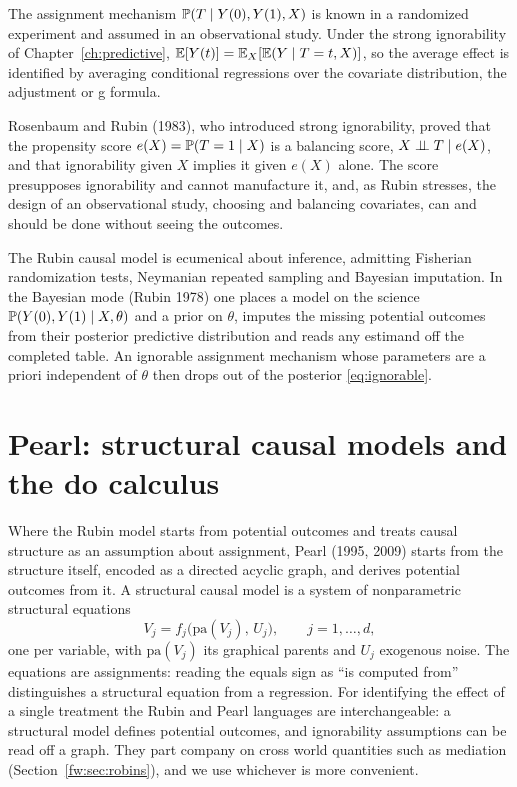 The assignment mechanism $\mathbb{P}(T \mid Y(0), Y(1), X)$ is known in a randomized experiment and assumed in an observational study. Under the strong ignorability of Chapter~\ref{ch:predictive}, $\mathbb{E}[Y(t)] = \mathbb{E}_X[\mathbb{E}(Y \mid T=t, X)]$, so the average effect is identified by averaging conditional regressions over the covariate distribution, the adjustment or g formula.

Rosenbaum and Rubin (1983), who introduced strong ignorability, proved that the propensity score $e(X) = \mathbb{P}(T=1 \mid X)$ is a balancing score, $X \perp\!\!\!\perp T \mid e(X)$, and that ignorability given $X$ implies it given $e(X)$ alone. The score presupposes ignorability and cannot manufacture it, and, as Rubin stresses, the design of an observational study, choosing and balancing covariates, can and should be done without seeing the outcomes.

The Rubin causal model is ecumenical about inference, admitting Fisherian randomization tests, Neymanian repeated sampling and Bayesian imputation. In the Bayesian mode (Rubin 1978) one places a model on the science $\mathbb{P}(Y(0), Y(1)\mid X,\theta)$ and a prior on $\theta$, imputes the missing potential outcomes from their posterior predictive distribution and reads any estimand off the completed table. An ignorable assignment mechanism whose parameters are a priori independent of $\theta$ then drops out of the posterior \eqref{eq:ignorable}. 

\section{Pearl: structural causal models and the do calculus}\label{fw:sec:pearl}

Where the Rubin model starts from potential outcomes and treats causal structure as an assumption about assignment, Pearl (1995, 2009) starts from the structure itself, encoded as a directed acyclic graph, and derives potential outcomes from it. A structural causal model is a system of nonparametric structural equations
\[
V_j = f_j\bigl(\mathrm{pa}(V_j),\, U_j\bigr), \qquad j = 1,\dots,d,
\]
one per variable, with $\mathrm{pa}(V_j)$ its graphical parents and $U_j$ exogenous noise. The equations are assignments: reading the equals sign as ``is computed from'' distinguishes a structural equation from a regression. For identifying the effect of a single treatment the Rubin and Pearl languages are interchangeable: a structural model defines potential outcomes, and ignorability assumptions can be read off a graph. They part company on cross world quantities such as mediation (Section~\ref{fw:sec:robins}), and we use whichever is more convenient.

